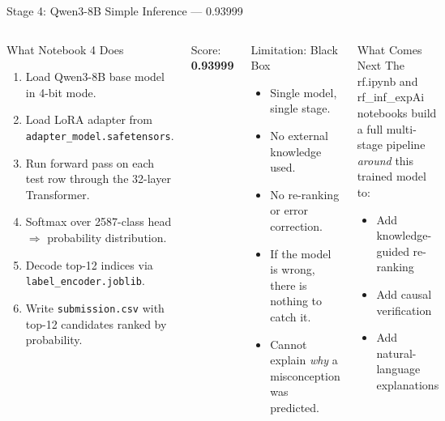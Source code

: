 \documentclass[aspectratio=169]{beamer}
\begin{document}
\begin{frame}{Stage 4: Qwen3-8B Simple Inference --- 0.93999}
\begin{columns}[T]
\begin{block}{What Notebook 4 Does}
\begin{enumerate}
  \item Load Qwen3-8B base model in 4-bit mode.
  \item Load LoRA adapter from \texttt{adapter\_model.safetensors}.
  \item Run forward pass on each test row through the 32-layer Transformer.
  \item Softmax over 2587-class head $\Rightarrow$ probability distribution.
  \item Decode top-12 indices via \texttt{label\_encoder.joblib}.
  \item Write \texttt{submission.csv} with top-12 candidates ranked by probability.
\end{enumerate}
\end{block}
\vspace{4pt}
\begin{center}
{\Large\color{GreenOk} Score: \textbf{0.93999}} 
\end{center}
\begin{alertblock}{Limitation: Black Box}
\begin{itemize}
  \item Single model, single stage.
  \item No external knowledge used.
  \item No re-ranking or error correction.
  \item If the model is wrong, there is nothing to catch it.
  \item Cannot explain \textit{why} a misconception was predicted.
\end{itemize}
\end{alertblock}
\vspace{8pt}
\begin{block}{What Comes Next}
The rf.ipynb and rf\_inf\_expAi notebooks build a full multi-stage pipeline \textit{around} this trained model to:
\begin{itemize}
  \item Add knowledge-guided re-ranking
  \item Add causal verification
  \item Add natural-language explanations
\end{itemize}
\end{block}
\end{columns}
\end{frame}
\end{document}
